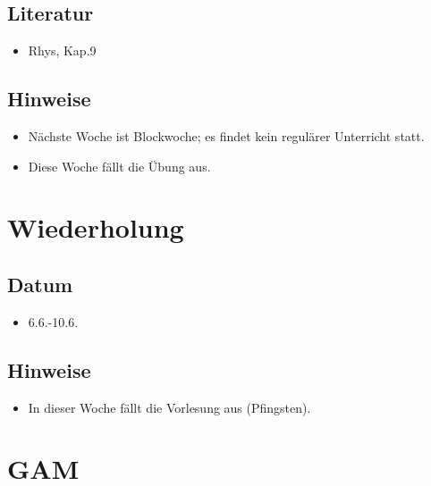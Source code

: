 \documentclass[
]{book}
\providecommand{\tightlist}{%
  \setlength{\itemsep}{0pt}\setlength{\parskip}{0pt}}
\begin{document}
\hypertarget{literatur-10}{%
\subsection{Literatur}\label{literatur-10}}

\begin{itemize}
\tightlist
\item
  Rhys, Kap.9
\end{itemize}

\hypertarget{hinweise-3}{%
\subsection{Hinweise}\label{hinweise-3}}

\begin{itemize}
\tightlist
\item
  Nächste Woche ist Blockwoche; es findet kein regulärer Unterricht statt.
\item
  Diese Woche fällt die Übung aus.
\end{itemize}

\hypertarget{wiederholung-1}{%
\section{Wiederholung}\label{wiederholung-1}}

\hypertarget{datum-11}{%
\subsection{Datum}\label{datum-11}}

\begin{itemize}
\tightlist
\item
  6.6.-10.6.
\end{itemize}

\hypertarget{hinweise-4}{%
\subsection{Hinweise}\label{hinweise-4}}

\begin{itemize}
\tightlist
\item
  In dieser Woche fällt die Vorlesung aus (Pfingsten).
\end{itemize}

\hypertarget{gam}{%
\section{GAM}\label{gam}}
\end{document}
